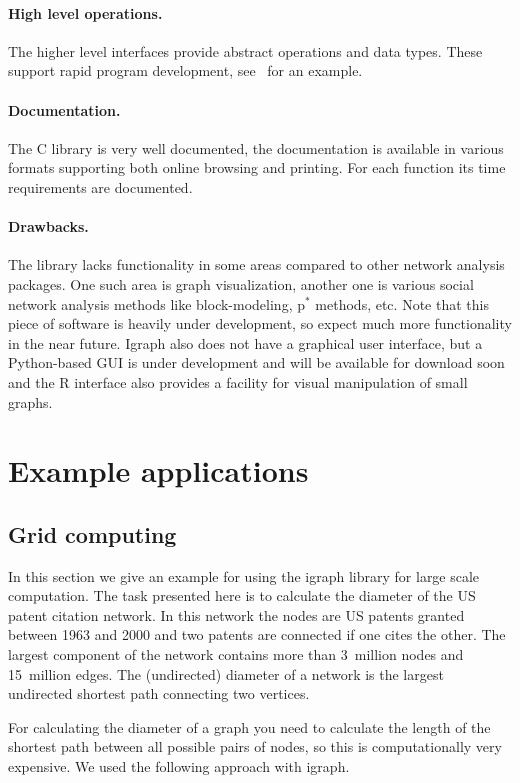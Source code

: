 \documentclass[twoside]{book}%
\begin{document}
\paragraph{High level operations.} The higher level interfaces provide
abstract operations and data types. These support rapid
program development, see~ for an example.

\paragraph{Documentation.} The C library is very well documented, the
documentation is available in various formats supporting both online
browsing and printing. For each function its time requirements are
documented.

\paragraph{Drawbacks.} The library lacks functionality in some areas
compared to other network analysis packages. One such area is graph
visualization, another one is various social network analysis methods
like block-modeling, p$^{*}$ methods, etc. Note that this piece of
software is heavily under development, so expect much more
functionality in the near future. Igraph also does not have a
graphical user interface, but a Python-based GUI is under development
and will be available for download soon and the R interface also
provides a facility for visual manipulation of small graphs.

\section{Example applications}

\subsection{Grid computing}

In this section we give an example for using the igraph library
for large scale computation. The task presented here is to calculate
the diameter of the US patent citation network. In this network the
nodes are US patents granted between 1963 and 2000 and two patents are
connected if one cites the other. The largest component of the network
contains more than 3~million nodes and 15~million edges. The
(undirected) diameter of a network is the largest undirected shortest
path connecting two vertices. 

For calculating the diameter of a graph you need to calculate the
length of the shortest path between all possible pairs of nodes, so
this is computationally very expensive. We used the following approach
with igraph. 
\end{document}
